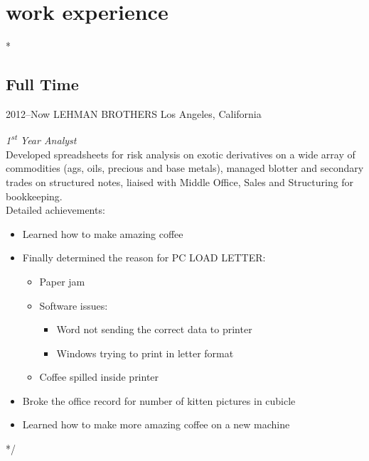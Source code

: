\documentclass[]{friggeri-cv} %
\begin{document}

\section{work experience}

\/*

\subsection{Full Time}

\begin{entrylist}

	\entry
	{2012--Now}
	{LEHMAN BROTHERS}
	{Los Angeles, California}
	{\emph{1\textsuperscript{st} Year Analyst} \\
		Developed spreadsheets for risk analysis on exotic derivatives on a wide array of commodities (ags, oils, precious and base metals), managed blotter and secondary trades on structured notes, liaised with Middle Office, Sales and Structuring for bookkeeping. \\
		Detailed achievements:
		\begin{itemize}
			\item Learned how to make amazing coffee
			\item Finally determined the reason for \textsc{PC LOAD LETTER}:
				\begin{itemize}
					\item Paper jam
					\item Software issues:
						\begin{itemize}
							\item Word not sending the correct data to printer
							\item Windows trying to print in letter format
						\end{itemize}
					\item Coffee spilled inside printer
				\end{itemize}
			\item Broke the office record for number of kitten pictures in cubicle
			\item Learned how to make more amazing coffee on a new machine
		\end{itemize}}

\end{entrylist}
*/
\end{document}

